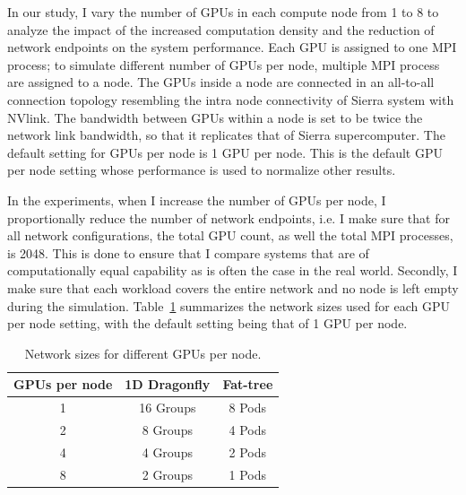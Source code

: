 
\vspace{0.08in}
In our study, I vary the number of GPUs in each compute node from 1 to
8 to analyze the impact of the increased computation density and the reduction
of network endpoints on the system performance. Each GPU is assigned
to one MPI process; to simulate different number of GPUs
per node, multiple MPI process are assigned to a node.
The GPUs inside a node are connected in an all-to-all connection topology resembling the intra node connectivity of Sierra system with NVlink.
The bandwidth between GPUs within a node
is set to be twice the network link bandwidth, so that it replicates that of Sierra supercomputer.
The default setting for GPUs per node is 1 GPU per node. This is the default
GPU per node setting whose performance is used to normalize other results. 

In the experiments, when I increase the number of GPUs per node, I
proportionally reduce the number of network endpoints, i.e. I make sure that
for all network configurations, the total GPU count, as well the total MPI
  processes, is 2048. This is done
  to ensure that I compare systems that are of computationally equal capability
  as is often the case in the real world. Secondly, I make sure that each
  workload covers the entire network and no node is left empty during the
  simulation. 
  Table~\ref{table:configs} summarizes the network sizes used for each GPU
  per node setting, with the default setting being that of 1 GPU per node.  

\begin{table}[h]
       \centering
\caption{Network sizes for different GPUs per node.}
        \vspace{-1em}
        \begin{tabular}{ccc} \toprule
        \textbf{GPUs per node} & \textbf{1D Dragonfly} & \textbf{Fat-tree}\\ \midrule 
        1 & 16 Groups & 
        8 Pods \\
        
        2 &
        8 Groups & 
        4 Pods \\
        
        4 & 4 Groups & 
        2 Pods \\
        
        8 & 
        2 Groups & 
        1 Pods\\ \bottomrule
        \end{tabular}
\label{table:configs}
\end{table}

